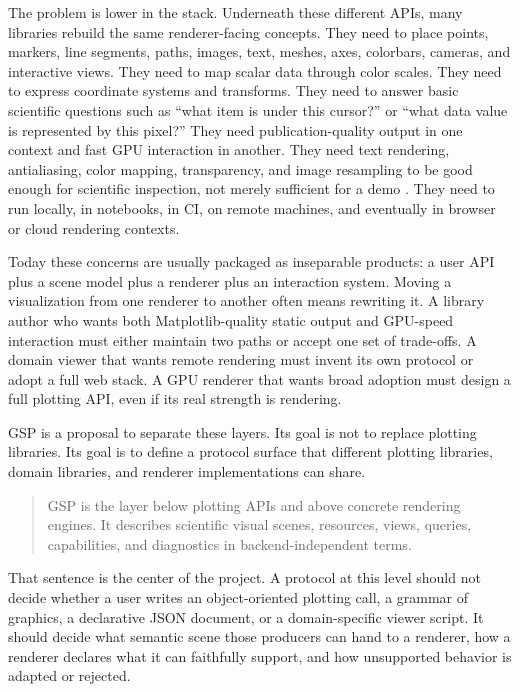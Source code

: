 \documentclass[a4paper,11pt]{article}
\newcommand{\gsp}{GSP\xspace}
\newcommand{\matplotlib}{Matplotlib\xspace}
\begin{document}
The problem is lower in the stack. Underneath these different APIs, many libraries rebuild the same
renderer-facing concepts. They need to place points, markers, line segments, paths, images, text,
meshes, axes, colorbars, cameras, and interactive views. They need to map scalar data through color
scales. They need to express coordinate systems and transforms. They need to answer basic scientific
questions such as ``what item is under this cursor?'' or ``what data value is represented by this
pixel?'' They need publication-quality output in one context and fast GPU interaction in another.
They need text rendering, antialiasing, color mapping, transparency, and image resampling to be
good enough for scientific inspection, not merely sufficient for a demo
\cite{Parker:1983,Mitchell:1988,Bujack:2018,McGuire:2013,Rougier:2018}. They need to run locally, in
notebooks, in CI, on remote machines, and eventually in browser or cloud rendering contexts.

Today these concerns are usually packaged as inseparable products: a user API plus a scene model
plus a renderer plus an interaction system. Moving a visualization from one renderer to another
often means rewriting it. A library author who wants both \matplotlib-quality static output and
GPU-speed interaction must either maintain two paths or accept one set of trade-offs. A domain
viewer that wants remote rendering must invent its own protocol or adopt a full web stack. A GPU
renderer that wants broad adoption must design a full plotting API, even if its real strength is
rendering.

\gsp is a proposal to separate these layers. Its goal is not to replace plotting libraries. Its goal
is to define a protocol surface that different plotting libraries, domain libraries, and renderer
implementations can share.

\begin{quote}
\gsp is the layer below plotting APIs and above concrete rendering engines. It describes scientific
visual scenes, resources, views, queries, capabilities, and diagnostics in backend-independent
terms.
\end{quote}

That sentence is the center of the project. A protocol at this level should not decide whether a
user writes an object-oriented plotting call, a grammar of graphics, a declarative JSON document, or
a domain-specific viewer script. It should decide what semantic scene those producers can hand to a
renderer, how a renderer declares what it can faithfully support, and how unsupported behavior is
adapted or rejected.
\end{document}
